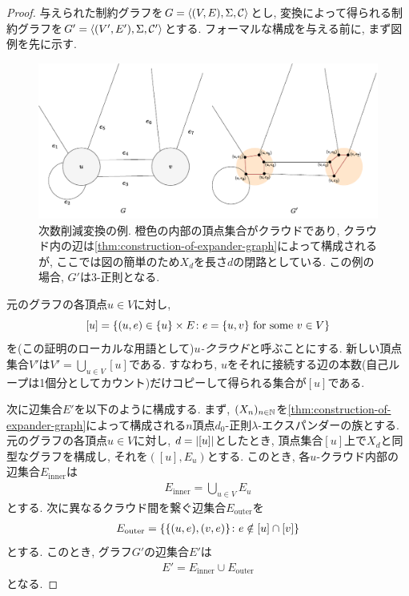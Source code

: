\begin{proof}

与えられた制約グラフを$G=\langle(V,E),\Sigma,\mathcal{C}\rangle$とし, 変換によって得られる制約グラフを$G'=\langle(V',E'),\Sigma,\mathcal{C}'\rangle$とする.
フォーマルな構成を与える前に, まず図例を先に示す.

\begin{figure}[h]
  \centering
  \includegraphics[width=\textwidth]{images/degree_reduction.pdf}
  \caption{次数削減変換の例. 橙色の内部の頂点集合がクラウドであり, クラウド内の辺は\cref{thm:construction-of-expander-graph}によって構成されるが, ここでは図の簡単のため$X_d$を長さ$d$の閉路としている. この例の場合, $G'$は$3$-正則となる.}
  \label{fig:degree-reduction}
\end{figure}

元のグラフの各頂点$u\in V$に対し, 
\[[u]=\qty{ (u,e) \in \{u\}\times E \colon e=\{u,v\} \text{ for some } v\in V }\]
を(この証明のローカルな用語として)\emph{$u$-クラウド}と呼ぶことにする.
新しい頂点集合$V'$は$V'=\bigcup_{u\in V} [u]$である.
すなわち, $u$をそれに接続する辺の本数(自己ループは1個分としてカウント)だけコピーして得られる集合が$[u]$である.

次に辺集合$E'$を以下のように構成する.
まず, $(X_n)_{n\in\mathbb{N}}$を\cref{thm:construction-of-expander-graph}によって構成される$n$頂点$d_0$-正則$\lambda$-エクスパンダーの族とする.
元のグラフの各頂点$u\in V$に対し, $d=\abs{[u]}$としたとき, 頂点集合$[u]$上で$X_d$と同型なグラフを構成し, それを$([u],E_u)$とする.
このとき, 各$u$-クラウド内部の辺集合$E_{\mathrm{inner}}$は
\begin{align*}
  E_{\mathrm{inner}} = \bigcup_{u\in V} E_u
\end{align*}
とする.
次に異なるクラウド間を繋ぐ辺集合$E_{\mathrm{outer}}$を
\begin{align*}
  E_{\mathrm{outer}} = \qty{\qty{ (u,e), (v,e) } \colon e\notin [u]\cap[v]}
\end{align*}
とする.
このとき, グラフ$G'$の辺集合$E'$は
\begin{align*}
  E' = E_{\mathrm{inner}} \cup E_{\mathrm{outer}}
\end{align*}
となる.


\end{proof}
